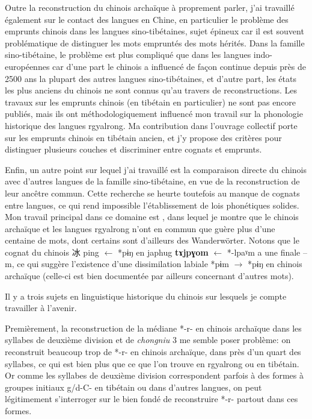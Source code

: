 \documentclass[oldfontcommands,oneside,a4paper,11pt]{memoir}
\newcommand{\ipa}[1]{{\phon\textbf{#1}}}
\newcommand{\zh}[1]{{\cn #1}}
\begin{document}
Outre la reconstruction du chinois archaïque à proprement parler, j'ai travaillé également sur le contact des langues en Chine, en particulier le problème des emprunts chinois dans les langues sino-tibétaines, sujet épineux car il est souvent problématique de distinguer les mots empruntés des mots hérités. Dans la famille sino-tibétaine, le problème est plus compliqué que dans les langues indo-européennes car d’une part le chinois a influencé de façon continue depuis près de 2500 ans la plupart des autres langues sino-tibétaines, et d’autre part, les états les plus anciens du chinois ne sont connus qu’au travers de reconstructions. Les travaux sur les emprunts chinois (en tibétain en particulier) ne sont pas encore publiés, mais ils ont méthodologiquement influencé mon travail sur la phonologie historique des langues rgyalrong. Ma contribution dans l'ouvrage collectif \citet{jacques13jieci} porte sur les emprunts chinois en tibétain ancien, et j'y propose des critères pour distinguer plusieurs couches et discriminer entre cognats et emprunts.

Enfin, un autre point sur lequel j'ai travaillé est la comparaison directe du chinois avec d'autres langues de la famille sino-tibétaine, en vue de la reconstruction de leur ancêtre commun. Cette recherche se heurte toutefois au manque de cognats entre langues, ce qui rend impossible l'établissement de lois phonétiques solides. Mon travail principal dans ce domaine est \citet{jacques05}, dans lequel je montre que le chinois archaïque et les langues rgyalrong n'ont en commun que guère plus d'une centaine de mots, dont certains sont d'ailleurs des Wanderwörter. Notons que le cognat du chinois \zh{冰} ping $\leftarrow$ *pɨŋ en japhug \ipa{tɤjpɣom} $\leftarrow$ *-lpaˠm a une finale --m, ce qui suggère l'existence d'une dissimilation labiale *pɨm $\rightarrow $ *pɨŋ en chinois archaïque (celle-ci est bien documentée par ailleurs concernant d'autres mots).

 
Il y a trois sujets en linguistique historique du chinois sur lesquels je compte travailler à l'avenir.

Premièrement,   la reconstruction de la médiane *-r- en chinois archaïque dans les syllabes de deuxième division et de \textit{chongniu} 3 me semble poser problème: on reconstruit beaucoup trop de *-r- en chinois archaïque, dans près d'un quart des syllabes, ce qui est bien plus que ce que l'on trouve en rgyalrong ou en tibétain. Or comme les syllabes de deuxième division correspondent parfois à des formes à groupes initiaux g/d-C- en tibétain ou dans d'autres langues, on peut légitimement s'interroger sur le bien fondé de reconstruire *-r- partout dans ces formes. 
\end{document}
